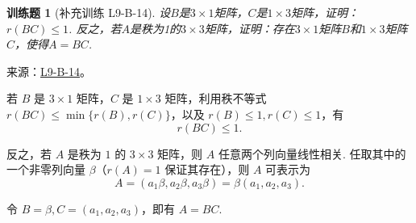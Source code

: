 \documentclass[12pt,fontset=fandol]{ctexart}
\newtheorem{exercise}{训练题}[section]
\begin{document}
\begin{exercise}[补充训练 L9-B-14]\label{prob:L9-B-14}
设$B$是$3 \times 1$矩阵，$C$是$1 \times 3$矩阵，证明：$r(BC) \leqslant 1$. 反之，若$A$是秩为1的$3 \times 3$矩阵，证明：存在$3 \times 1$矩阵$B$和$1 \times 3$矩阵$C$，使得$A = BC$.
\end{exercise}
\noindent 来源：\href{https://github.com/yhwu-is/Linear-Algebra-Left-Undone/blob/new/%E8%AE%B2%E4%B9%89/%E4%B8%93%E9%A2%98/9%20%E7%9F%A9%E9%98%B5%E8%BF%90%E7%AE%97%E8%BF%9B%E9%98%B6.tex}{L9-B-14}。
\begin{solve}
若 $B$ 是 $3 \times 1$ 矩阵，$C$ 是 $1 \times 3$ 矩阵，利用秩不等式 $r(BC) \leqslant \min\{r(B), r(C)\}$，以及 $r(B) \leqslant 1, r(C) \leqslant 1$，有
            \[
                r(BC) \leqslant 1.
            \]

            反之，若 $A$ 是秩为 $1$ 的 $3 \times 3$ 矩阵，则 $A$ 任意两个列向量线性相关. 任取其中的一个非零列向量 $\beta$（$r(A)=1$ 保证其存在），则 $A$ 可表示为
            \[
                A = (a_1 \beta, a_2 \beta, a_3 \beta) = \beta (a_1 , a_2 , a_3).
            \]

            令 $B = \beta, C = (a_1 , a_2 , a_3)$，即有 $A = BC$.
\end{solve}
\end{document}
